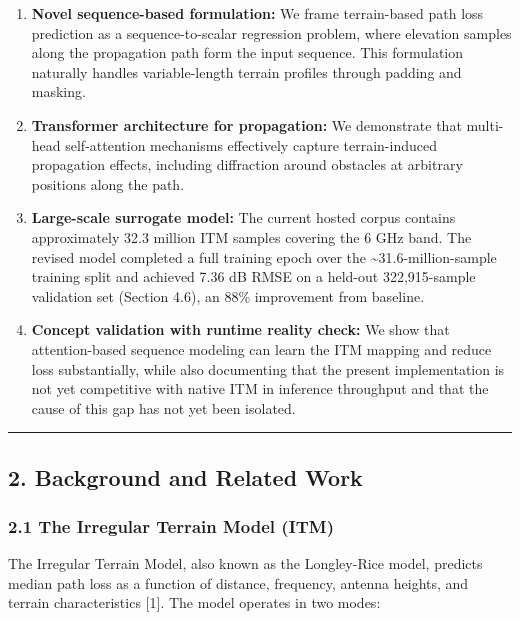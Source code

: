 \documentclass[
]{article}
\begin{document}
\begin{enumerate}
\def\labelenumi{\arabic{enumi}.}
\item
  \textbf{Novel sequence-based formulation:} We frame terrain-based path
  loss prediction as a sequence-to-scalar regression problem, where
  elevation samples along the propagation path form the input sequence.
  This formulation naturally handles variable-length terrain profiles
  through padding and masking.
\item
  \textbf{Transformer architecture for propagation:} We demonstrate that
  multi-head self-attention mechanisms effectively capture
  terrain-induced propagation effects, including diffraction around
  obstacles at arbitrary positions along the path.
\item
  \textbf{Large-scale surrogate model:} The current hosted corpus
  contains approximately 32.3 million ITM samples covering the 6 GHz
  band. The revised model completed a full training epoch over the
  \textasciitilde31.6-million-sample training split and achieved 7.36 dB
  RMSE on a held-out 322,915-sample validation set (Section 4.6), an
  88\% improvement from baseline.
\item
  \textbf{Concept validation with runtime reality check:} We show that
  attention-based sequence modeling can learn the ITM mapping and reduce
  loss substantially, while also documenting that the present
  implementation is not yet competitive with native ITM in inference
  throughput and that the cause of this gap has not yet been isolated.
\end{enumerate}

\begin{center}\rule{0.5\linewidth}{0.5pt}\end{center}

\subsection{2. Background and Related
Work}\label{background-and-related-work}

\subsubsection{2.1 The Irregular Terrain Model
(ITM)}\label{the-irregular-terrain-model-itm}

The Irregular Terrain Model, also known as the Longley-Rice model,
predicts median path loss as a function of distance, frequency, antenna
heights, and terrain characteristics {[}1{]}. The model operates in two
modes:
\end{document}
